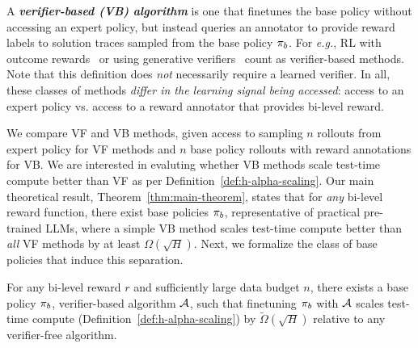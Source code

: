 A \emph{\textbf{verifier-based (VB) algorithm}} is one that finetunes the base policy without accessing an expert policy, but instead queries an annotator to provide reward labels to solution traces sampled from the base policy $\pi_b$. 
For \textit{e.g.}, RL with outcome rewards~\citep{deepseekai2025deepseekr1incentivizingreasoningcapability} or using generative verifiers~\citep{zhang2024generative} count as verifier-based methods. Note that this definition does \emph{not} necessarily require a learned verifier.
In all, these classes of methods \emph{differ in the learning signal being accessed}: access to an expert policy vs. access to a reward annotator that provides bi-level reward. 

We compare VF and VB methods, given access to sampling $n$ rollouts from expert policy for VF methods and $n$ base policy rollouts with reward annotations for VB. We are interested in evaluting whether VB methods scale test-time compute better than VF as per Definition~\ref{def:h-alpha-scaling}. Our main theoretical result, Theorem~\ref{thm:main-theorem}, states that for \emph{any} bi-level reward function, there exist base policies $\pi_b$, representative of practical pre-trained LLMs, where a simple VB method scales test-time compute better than \emph{all} VF methods by at least $\Omega(\sqrt{H})$. Next, we formalize the class of base policies that induce this separation.  
{
\setlength{\abovedisplayskip}{-10pt}
\setlength{\belowdisplayskip}{-10pt}
\begin{tcolorbox}[colback=red!6!white,colframe=black,boxsep=0pt,top=4pt,bottom=4pt,left=3pt,right=3pt]
\begin{theorem}
    \label{thm:main-theorem}
    For any bi-level reward $r$ and sufficiently large data budget $n$, there exists a base policy $\pi_b$, verifier-based algorithm ${\mathcal{A}}$, such that finetuning $\pi_b$ with ${\mathcal{A}}$ scales test-time compute (Definition~\ref{def:h-alpha-scaling}) by $\tilde{\Omega}(\sqrt{H})$ relative to
    any verifier-free algorithm. 
\end{theorem}
\end{tcolorbox}
}

